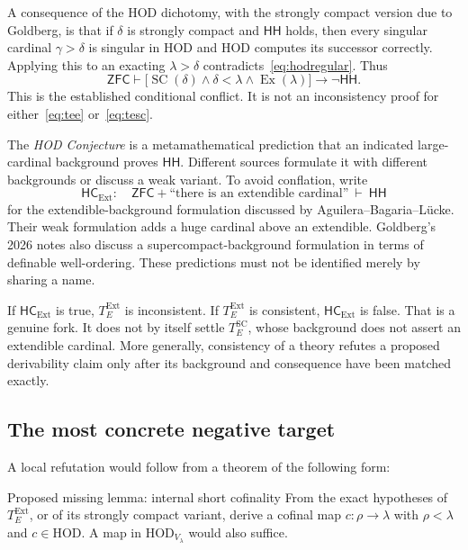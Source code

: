 \documentclass[11pt,letterpaper]{article}
\theoremstyle{definition}
\newcommand{\ZFC}{\mathsf{ZFC}}
\newcommand{\HOD}{\mathrm{HOD}}
\newcommand{\HH}{\mathsf{HH}}
\newcommand{\Ex}{\operatorname{Ex}}
\newcommand{\SC}{\operatorname{SC}}
\begin{document}
A consequence of the HOD dichotomy, with the strongly compact version due to Goldberg, is that if $\delta$ is strongly compact and $\HH$ holds, then every singular cardinal $\gamma>\delta$ is singular in HOD and HOD computes its successor correctly. Applying this to an exacting $\lambda>\delta$ contradicts~\eqref{eq:hodregular}. Thus
\begin{equation}
 \ZFC\vdash
 \bigl[\SC(\delta)\wedge\delta<\lambda\wedge\Ex(\lambda)\bigr]
 \longrightarrow\neg\HH.
 \label{eq:exhh}
\end{equation}
This is the established conditional conflict. It is not an inconsistency proof for either~\eqref{eq:tee} or~\eqref{eq:tesc}. \cite{goldberghod,abl,abgl}

The \emph{HOD Conjecture} is a metamathematical prediction that an indicated large-cardinal background proves $\HH$. Different sources formulate it with different backgrounds or discuss a weak variant. To avoid conflation, write
\[
 \mathsf{HC}_{\mathrm{Ext}}:
 \quad \ZFC+\text{``there is an extendible cardinal''}\ \vdash\ \HH
\]
for the extendible-background formulation discussed by Aguilera--Bagaria--L\"ucke. Their weak formulation adds a huge cardinal above an extendible. Goldberg's 2026 notes also discuss a supercompact-background formulation in terms of definable well-ordering. These predictions must not be identified merely by sharing a name. \cite{abl,cover}

If $\mathsf{HC}_{\mathrm{Ext}}$ is true, $T_E^{\mathrm{Ext}}$ is inconsistent. If $T_E^{\mathrm{Ext}}$ is consistent, $\mathsf{HC}_{\mathrm{Ext}}$ is false. That is a genuine fork. It does not by itself settle $T_E^{\mathrm{SC}}$, whose background does not assert an extendible cardinal. More generally, consistency of a theory refutes a proposed derivability claim only after its background and consequence have been matched exactly.

\subsection{The most concrete negative target}

A local refutation would follow from a theorem of the following form:
\begin{assessment}{Proposed missing lemma: internal short cofinality}
From the exact hypotheses of $T_E^{\mathrm{Ext}}$, or of its strongly compact variant, derive a cofinal map $c:\rho\to\lambda$ with $\rho<\lambda$ and $c\in\HOD$. A map in $\HOD_{V_\lambda}$ would also suffice.
\end{assessment}
\end{document}
